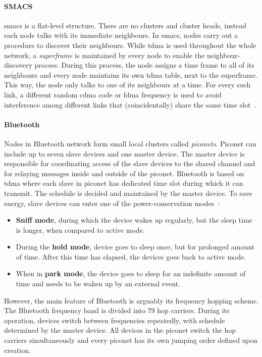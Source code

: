 \paragraph{SMACS}
\acrshort{smacs} is a flat-level structure. There are no clusters and cluster heads, instead each node talks with its immediate neighbours. In \acrlong{smacs}, nodes carry out a procedure to discover their neighbours. While \acrshort{tdma} is used throughout the whole network, a \textit{superframe} is maintained by every node to enable the neighbour-discovery process. During this process, the node assigns a time frame to all of its neighbours and every node maintains its own \acrshort{tdma} table, next to the superframe. This way, the node only talks to one of its neighbours at a time. For every such link, a different random \acrshort{cdma} code or \acrshort{fdma} frequency is used to avoid interference among different links that (coincidentally) share the same time slot~\cite{Sohraby2007WirelessApplications, Sohrabi2000ProtocolsNetwork}.

\paragraph{Bluetooth}
Nodes in Bluetooth network form small local clusters called \textit{piconets}. Piconet can include up to seven slave devices and one master device. The master device is responsible for coordinating access of the slave devices to the shared channel and for relaying messages inside and outside of the piconet. Bluetooth is based on \acrshort{tdma} where each slave in piconet has dedicated time slot during which it can transmit. The schedule is decided and maintained by the master device. To save energy, slave devices can enter one of the power-conservation modes~\cite{Haartsen2000TheSystem, Sohraby2007WirelessApplications}:
\begin{itemize}[noitemsep]
    \item \textbf{Sniff mode}, during which the device wakes up regularly, but the sleep time is longer, when compared to active mode.
    \item During the \textbf{hold mode}, device goes to sleep once, but for prolonged amount of time. After this time has elapsed, the devices goes back to active mode.
    \item When in \textbf{park mode}, the device goes to sleep for an indefinite amount of time and needs to be waken up by an external event.
\end{itemize}

However, the main feature of Bluetooth is arguably its frequency hopping scheme. The Bluetooth frequency band is divided into 79 hop carriers. During its operation, devices switch between frequencies repeatedly, with schedule determined by the master device. All devices in the piconet switch the hop carriers simultaneously and every piconet has its own jumping order defined upon creation.

